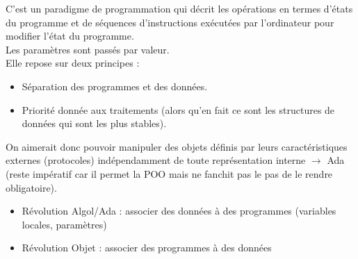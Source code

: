  C'est un paradigme de programmation qui décrit les opérations en termes d'états du programme et de séquences d'instructions exécutées par l'ordinateur pour modifier l'état du programme. \\ Les paramètres sont passés par valeur. \\
Elle repose sur deux principes :
\begin{itemize}
	\item Séparation des programmes et des données.
	\item Priorité donnée aux traitements (alors qu'en fait ce sont les structures de données qui sont les plus stables).
\end{itemize}

On aimerait donc pouvoir manipuler des objets définis par leurs caractéristiques externes (protocoles) indépendamment de toute représentation interne $\rightarrow$ Ada (reste impératif car il permet la POO mais ne fanchit pas le pas de le rendre obligatoire). \\

\begin{itemize}
	\item Révolution Algol/Ada : associer des données à des programmes (variables locales, paramètres)
	\item Révolution Objet : associer des programmes à des données
\end{itemize}


